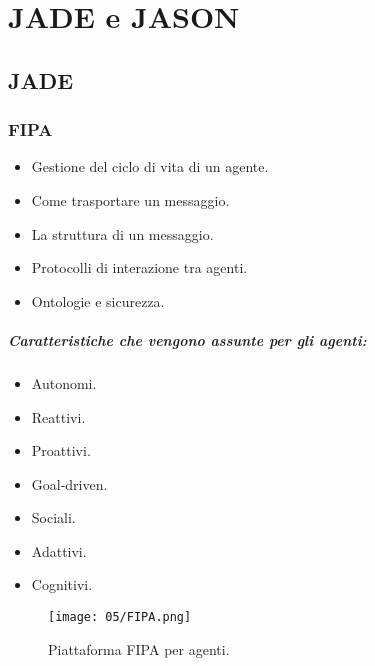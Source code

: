 \chapter{JADE e JASON}

\section{JADE}

\subsection{FIPA}



\begin{itemize}
  \item Gestione del ciclo di vita di un agente. 
  \item Come trasportare un messaggio. 
  \item La struttura di un messaggio. 
  \item Protocolli di interazione tra agenti. 
  \item Ontologie e sicurezza.
\end{itemize}


\paragraph{Caratteristiche che vengono assunte per gli agenti:}

\begin{itemize}
  \item Autonomi. 
  \item Reattivi. 
  \item Proattivi. 
  \item Goal-driven. 
  \item Sociali. 
  \item Adattivi. 
  \item Cognitivi.
\end{itemize}

\begin{figure}[!h]
    \centering
    \texttt{[image: 05/FIPA.png]}
  \caption{Piattaforma FIPA per agenti.}
\end{figure}

